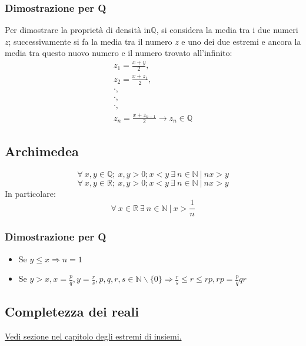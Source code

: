 \subsubsection*{Dimostrazione per Q}
Per dimostrare la propriet\`a di densit\`a in$\mathbb{Q}$, si considera la media tra i due numeri $z$; successivamente si fa la media tra il numero $z$ e uno dei due estremi
e ancora la media tra questo nuovo numero e il numero trovato all'infinito:
\begin{gather*}
z_1=\frac{x+y}{2},\\
z_2=\frac{x+z_1}{2},\\
\cdot,\\
\cdot,\\
\cdot,\\
z_n=\frac{x+z_{n-1}}{2}\rightarrow z_n\in\mathbb{Q}
\end{gather*}

\subsection{Archimedea}
\begin{equation*}
\forall\ x,y \in \mathbb{Q};\ x,y > 0; x<y\ \exists\ n \in \mathbb{N}\ |\ nx>y
\end{equation*}
\begin{equation*}
\forall\ x,y \in \mathbb{R};\ x,y > 0; x<y\ \exists\ n \in \mathbb{N}\ |\ nx>y
\end{equation*}
In particolare:
\begin{equation*}
\forall\ x \in \mathbb{R}\ \exists\ n \in \mathbb{N}\ |\ x>\frac{1}{n}
\end{equation*}
\subsubsection*{Dimostrazione per Q}
\begin{itemize}
\item Se $y\le x\Rightarrow n=1$
\item Se $y>x, x=\frac{p}{q}, y=\frac{r}{s}, p,q,r,s\in\mathbb{N}\backslash\{0\}\Rightarrow \frac{r}{s}\le r\le rp, rp=\frac{p}{q}qr$
\end{itemize}

\subsection{Completezza dei reali}
\hyperref[sec: CompletezzaReali]{\color{cyan}Vedi sezione nel capitolo degli estremi di insiemi.}
